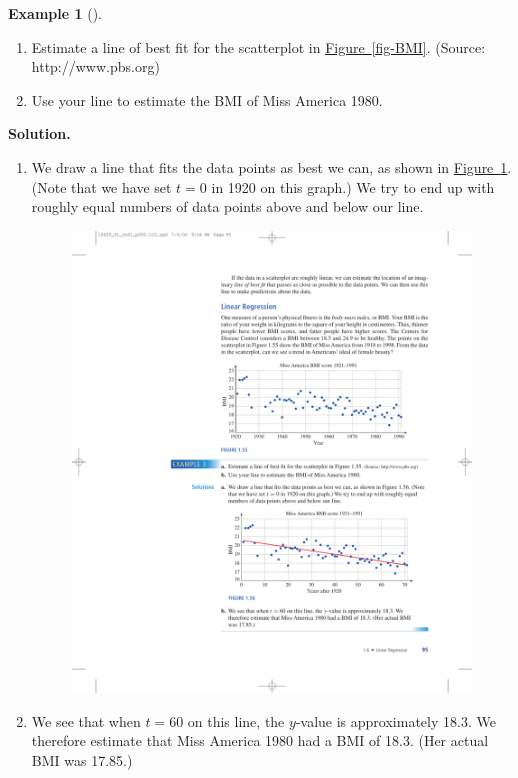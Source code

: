 \documentclass[10pt,]{book}
\theoremstyle{plain}
\theoremstyle{definition}
\theoremstyle{definition}
\newtheorem{example}[theorem]{Example}
\theoremstyle{definition}
\theoremstyle{definition}
\numberwithin{equation}{part}
\begin{document}
\begin{example}[]\label{example-BMI}
\leavevmode%
\begin{enumerate}[label=*\alph**]
\item\hypertarget{li-1303}{}Estimate a line of best fit for the scatterplot in \hyperref[fig-BMI]{Figure~\ref{fig-BMI}}. (Source: http://www.pbs.org)%
\item\hypertarget{li-1304}{}Use your line to estimate the BMI of Miss America 1980.%
\end{enumerate}
%
\par\medskip\noindent%
\textbf{Solution.}\quad \leavevmode%
\begin{enumerate}[label=*\alph**]
\item\hypertarget{li-1305}{}We draw a line that fits the data points as best we can, as shown in \hyperref[fig-BMI2]{Figure~\ref{fig-BMI2}}. (Note that we have set \(t = 0\) in 1920 on this graph.) We try to end up with roughly equal numbers of data points above and below our line. \begin{figure}
\centering
\includegraphics[width=1\linewidth]{images/fig-BMI2}
\caption{\label{fig-BMI2}}
\end{figure}
%
\item\hypertarget{li-1306}{}We see that when \(t = 60\) on this line, the \(y\)-value is approximately 18.3. We therefore estimate that Miss America 1980 had a BMI of 18.3. (Her actual BMI was 17.85.)%
\end{enumerate}
%
\end{example}
\end{document}
